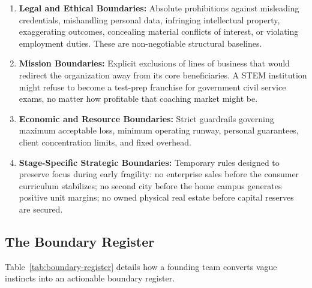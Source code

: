 \begin{enumerate}[leftmargin=12pt,itemsep=2.5pt,topsep=1pt,parsep=0pt]
  \item \textbf{Legal and Ethical Boundaries:} Absolute prohibitions against misleading credentials, mishandling personal data, infringing intellectual property, exaggerating outcomes, concealing material conflicts of interest, or violating employment duties. These are non-negotiable structural baselines.
  \item \textbf{Mission Boundaries:} Explicit exclusions of lines of business that would redirect the organization away from its core beneficiaries. A STEM institution might refuse to become a test-prep franchise for government civil service exams, no matter how profitable that coaching market might be.
  \item \textbf{Economic and Resource Boundaries:} Strict guardrails governing maximum acceptable loss, minimum operating runway, personal guarantees, client concentration limits, and fixed overhead.
  \item \textbf{Stage-Specific Strategic Boundaries:} Temporary rules designed to preserve focus during early fragility: no enterprise sales before the consumer curriculum stabilizes; no second city before the home campus generates positive unit margins; no owned physical real estate before capital reserves are secured.
\end{enumerate}

\subsection{The Boundary Register}

Table~\ref{tab:boundary-register} details how a founding team converts vague instincts into an actionable boundary register.


